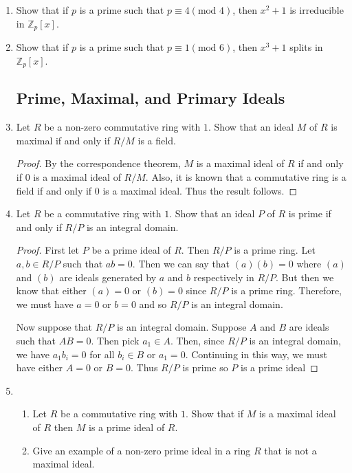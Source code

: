\documentclass{article}
\theoremstyle{definition}
\newcommand{\m}[1]{(\text{mod }{#1})}
\newcommand{\Z}{\mathbb{Z}}
\begin{document}
\begin{enumerate}
            \item Show that if $p$ is a prime such that $p \equiv 4\m{4}$, then $x^2+1$ is irreducible in $\Z_p[x]$.
            
            \item Show that if $p$ is a prime such that $p\equiv 1\m{6}$, then $x^3+1$ splits in $\Z_p[x]$.
        
        \subsection{Prime, Maximal, and Primary Ideals}

            \item Let $R$ be a non-zero commutative ring with $1$. Show that an ideal $M$ of $R$ is maximal if and only if $R/M$ is a field.
            
            \begin{proof}
                By the correspondence theorem, $M$ is a maximal ideal of $R$ if and only if $0$ is a maximal ideal of $R/M$. Also, it is known that a commutative ring is a field if and only if $0$ is a maximal ideal. Thus the result follows.
            \end{proof}

            \item Let $R$ be a commutative ring with $1$. Show that an ideal $P$ of $R$ is prime if and only if $R/P$ is an integral domain.
            
            \begin{proof}
                First let $P$ be a prime ideal of $R$. Then $R/P$ is a prime ring. Let $a,b \in R/P$ such that $ab=0$. Then we can say that $(a)(b)=0$ where $(a)$ and $(b)$ are ideals generated by $a$ and $b$ respectively in $R/P$. But then we know that either $(a)=0$ or $(b)=0$ since $R/P$ is a prime ring. Therefore, we must have $a=0$ or $b=0$ and so $R/P$ is an integral domain.

                Now suppose that $R/P$ is an integral domain. Suppose $A$ and $B$ are ideals such that $AB=0$. Then pick $a_1\in A$. Then, since $R/P$ is an integral domain, we have $a_1b_i=0$ for all $b_i\in B$ or $a_1=0$. Continuing in this way, we must have either $A=0$ or $B=0$. Thus $R/P$ is prime so $P$ is a prime ideal
            \end{proof}

            \item
                \begin{enumerate}
                    \item Let $R$ be a commutative ring with $1$. Show that if $M$ is a maximal ideal of $R$ then $M$ is a prime ideal of $R$.
                    \item Give an example of a non-zero prime ideal in a ring $R$ that is not a maximal ideal.
                \end{enumerate}


\end{enumerate}
\end{document}
